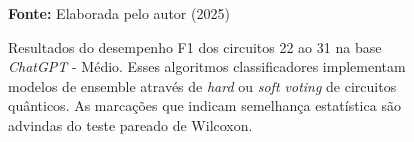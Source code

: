 \begin{figure}
\caption{Resultados do desempenho F1 dos circuitos 22 ao 31 na base \textit{ChatGPT} - Médio. Esses algoritmos classificadores implementam modelos de ensemble através de \textit{hard} ou \textit{soft voting} de circuitos quânticos. As marcações que indicam semelhança estatística são advindas do teste pareado de Wilcoxon.}
\label{fig:f1:medium:g7}
     \centering
    \centering

      \par\medskip\ABNTEXfontereduzida\selectfont\textbf{Fonte:} Elaborada pelo autor (2025) \par\medskip
\end{figure}